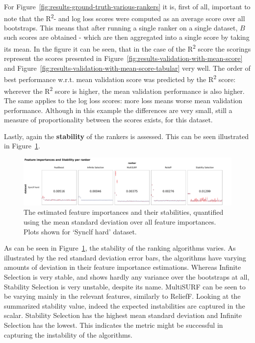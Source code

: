 \documentclass[../main.tex]{subfiles}
\begin{document}
For Figure~\ref{fig:results-ground-truth-various-rankers} it is, first of all, important to note that the R\textsuperscript{2}- and log loss scores were computed as an average score over all bootstraps. This means that after running a single ranker on a single dataset, $B$ such scores are obtained - which are then aggregated into a single score by taking its mean. In the figure it can be seen, that in the case of the R\textsuperscript{2} score the scorings represent the scores presented in Figure~\ref{fig:results-validation-with-mean-score} and Figure~\ref{fig:results-validation-with-mean-score-tabular} very well. The order of best performance w.r.t. mean validation score was predicted by the R\textsuperscript{2} score: wherever the R\textsuperscript{2} score is higher, the mean validation performance is also higher. The same applies to the log loss scores: more loss means worse mean validation performance. Although in this example the differences are very small, still a measure of proportionality between the scores exists, for this dataset.


Lastly, again the \textbf{stability} of the rankers is assessed. This can be seen illustrated in Figure~\ref{fig:results-importances-stability-multiple-rankers}.

\begin{figure}[ht]
    \centering
    \includegraphics[width=\linewidth]{report/images/results-importances-stability-multiple-rankers.pdf}
    \caption{The estimated feature importances and their stabilities, quantified using the mean standard deviation over all feature importances. Plots shown for `Synclf hard' dataset.}
    \label{fig:results-importances-stability-multiple-rankers}
\end{figure}

As can be seen in Figure~\ref{fig:results-importances-stability-multiple-rankers}, the stability of the ranking algorithms varies. As illustrated by the red standard deviation error bars, the algorithms have varying amounts of deviation in their feature importance estimations. Whereas Infinite Selection is very stable, and shows hardly any variance over the bootstraps at all, Stability Selection is very unstable, despite its name. MultiSURF can be seen to be varying mainly in the relevant features, similarly to ReliefF. Looking at the summarized stability value, indeed the expected instabilities are captured in the scalar. Stability Selection has the highest mean standard deviation and Infinite Selection has the lowest. This indicates the metric might be successful in capturing the instability of the algorithms.
\end{document}
